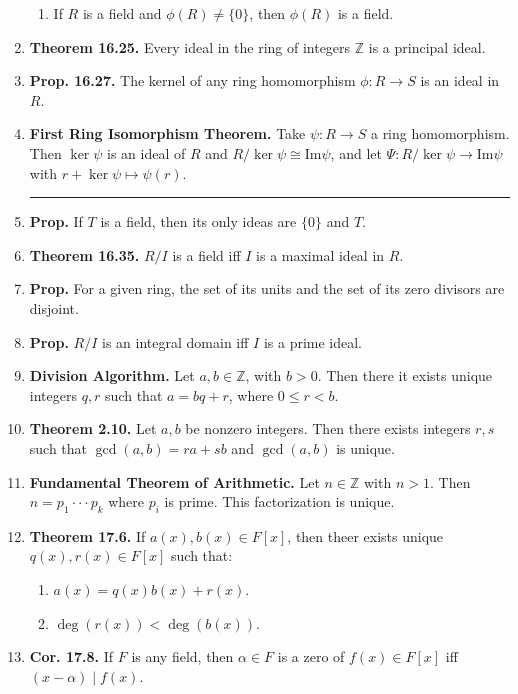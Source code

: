 \begin{enumerate}
\begin{enumerate}
            \item If $R$ is a field and $\phi(R) \neq \{0\}$, then $\phi(R)$ is a field. 
        \end{enumerate}
        \item \textbf{Theorem 16.25. } Every ideal in the ring of integers $\mathbb{Z}$ is a principal ideal. 
        \item \textbf{Prop. 16.27. } The kernel of any ring homomorphism $\phi: R \to S$ is an ideal in $R$. 
	\item \textbf{First Ring Isomorphism Theorem. } Take $\psi: R \to S$ a ring homomorphism. Then $\ker\psi$ is an ideal of $R$ and $R/\ker\psi \cong \textrm{Im}\psi$, and let $\Psi: R/\ker\psi \to \textrm{Im}\psi$ with $r + \ker\psi \mapsto \psi(r)$. 
	\begin{center}
		\hrule
	\end{center}
	\item \textbf{Prop. } If $T$ is a field, then its only ideas are $\{0\}$ and $T$. 
	\item \textbf{Theorem 16.35. } $R/I$ is a field iff $I$ is a maximal ideal in $R$. 
	\item \textbf{Prop. } For a given ring, the set of its units and the set of its zero divisors are disjoint. 
	\item \textbf{Prop. } $R/I$ is an integral domain iff $I$ is a prime ideal. 
	\item \textbf{Division Algorithm. } Let $a,b \in \mathbb{Z}$, with $b>0$. Then there it exists unique integers $q,r$ such that $a=bq+r$, where $0 \leq r < b$. 
	\item \textbf{Theorem 2.10. } Let $a,b$ be nonzero integers. Then there exists integers $r,s$ such that $\gcd(a,b)=ra+sb$ and $\gcd(a,b)$ is unique. 
	\item \textbf{Fundamental Theorem of Arithmetic. } Let $n \in \mathbb{Z}$ with $n>1$. Then $n=p_1 \cdot \cdot \cdot p_k$ where $p_i$ is prime. This factorization is unique. 
	\item \textbf{Theorem 17.6. } If $a(x),b(x) \in F[x]$, then theer exists unique $q(x),r(x) \in F[x]$ such that: 
	\begin{enumerate}
		\item $a(x) = q(x)b(x)+r(x)$. 
		\item $\deg(r(x)) < \deg(b(x))$. 
	\end{enumerate}
	\item \textbf{Cor. 17.8. } If $F$ is any field, then $\alpha \in F$ is a zero of $f(x) \in F[x]$ iff $(x-\alpha) \mid f(x)$. 

\end{enumerate}
